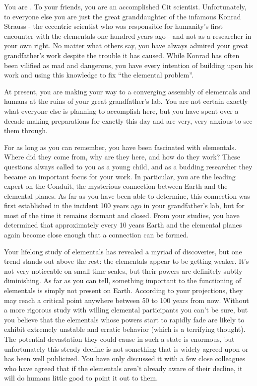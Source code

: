 \documentclass[char]{elementals}
\begin{document}
\name{\cGD{}}

You are \cGD{\intro}. To your friends, you are an accomplished Cit scientist. Unfortunately, to everyone else you are just the great granddaughter of the infamous Konrad Strauss - the eccentric scientist who was responsible for humanity's first encounter with the elementals one hundred years ago - and not as a researcher in your own right. No matter what others say, you have always admired your great grandfather's work despite the trouble it has caused. While Konrad has often been vilified as mad and dangerous, you have every intention of building upon his work and using this knowledge to fix ``the elemental problem''.

At present, you are making your way to a converging assembly of elementals and humans at the ruins of your great grandfather's lab. You are not certain exactly what everyone else is planning to accomplish here, but you have spent over a decade making preparations for exactly this day and are very, very anxious to see them through.


For as long as you can remember, you have been fascinated with elementals. Where did they come from, why are they here, and how do they work? These questions always called to you as a young child, and as a budding researcher they became an important focus for your work. In particular, you are the leading expert on the Conduit, the mysterious connection between Earth and the elemental planes. As far as you have been able to determine, this connection was first established in the incident 100 years ago in your grandfather's lab, but for most of the time it remains dormant and closed. From your studies, you have determined that approximately every 10 years Earth and the elemental planes again become close enough that a connection can be formed.

Your lifelong study of elementals has revealed a myriad of discoveries, but one trend stands out above the rest: the elementals appear to be getting weaker. It's not very noticeable on small time scales, but their powers are definitely subtly diminishing. As far as you can tell, something important to the functioning of elementals is simply not present on Earth. According to your projections, they may reach a critical point anywhere between 50 to 100 years from now. Without a more rigorous study with willing elemental participants you can't be sure, but you believe that the elementals whose powers start to rapidly fade are likely to exhibit extremely unstable and erratic behavior (which is a terrifying thought). The potential devastation they could cause in such a state is enormous, but unfortunately this steady decline is not something that is widely agreed upon or has been well publicized. You have only discussed it with a few close colleagues who have agreed that if the elementals aren't already aware of their decline, it will do humans little good to point it out to them.
\end{document}
